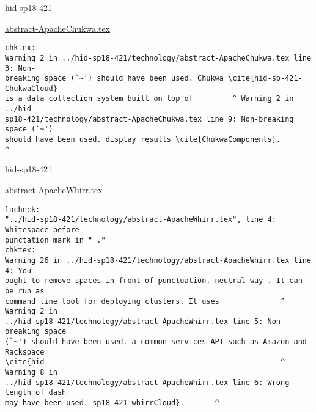 

\begin{IU}

hid-sp18-421

\href{https://github.com/cloudmesh-community/hid-sp18-421/blob/master//technology/abstract-ApacheChukwa.tex}{abstract-ApacheChukwa.tex}

\begin{tiny}
\begin{verbatim}
chktex:
Warning 2 in ../hid-sp18-421/technology/abstract-ApacheChukwa.tex line 3: Non-
breaking space (`~') should have been used. Chukwa \cite{hid-sp-421-ChukwaCloud}
is a data collection system built on top of         ^ Warning 2 in ../hid-
sp18-421/technology/abstract-ApacheChukwa.tex line 9: Non-breaking space (`~')
should have been used. display results \cite{ChukwaComponents}.
^
\end{verbatim}
\end{tiny}
\end{IU}



\begin{IU}

hid-sp18-421

\href{https://github.com/cloudmesh-community/hid-sp18-421/blob/master//technology/abstract-ApacheWhirr.tex}{abstract-ApacheWhirr.tex}

\begin{tiny}
\begin{verbatim}
lacheck:
"../hid-sp18-421/technology/abstract-ApacheWhirr.tex", line 4: Whitespace before
punctation mark in " ."
chktex:
Warning 26 in ../hid-sp18-421/technology/abstract-ApacheWhirr.tex line 4: You
ought to remove spaces in front of punctuation. neutral way . It can be run as
command line tool for deploying clusters. It uses              ^ Warning 2 in
../hid-sp18-421/technology/abstract-ApacheWhirr.tex line 5: Non-breaking space
(`~') should have been used. a common services API such as Amazon and Rackspace
\cite{hid-                                                     ^ Warning 8 in
../hid-sp18-421/technology/abstract-ApacheWhirr.tex line 6: Wrong length of dash
may have been used. sp18-421-whirrCloud}.       ^
\end{verbatim}
\end{tiny}
\end{IU}



